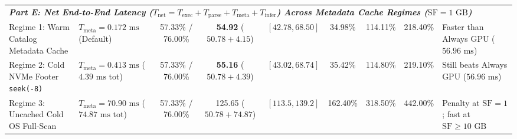 \documentclass[10pt,a4paper]{article}
\newenvironment{fitasttable}{%
  \begin{lrbox}{\asttblbox}%
}{%
  \end{lrbox}%
  \sbox{\asttblboxB}{%
    \ifdim\wd\asttblbox>0.96\textwidth
      \resizebox{0.96\textwidth}{!}{\usebox{\asttblbox}}%
    \else
      \usebox{\asttblbox}%
    \fi
  }%
  \ifdim\ht\asttblboxB>0.78\textheight
    \resizebox{!}{0.78\textheight}{\usebox{\asttblboxB}}%
  \else
    \usebox{\asttblboxB}%
  \fi
}
\begin{document}
\begin{table}[t!]
\begin{fitasttable}
\begin{tabular}{@{}llccccccl@{}}
\hline
\multicolumn{9}{l}{\textit{\textbf{Part E: Net End-to-End Latency ($T_{\text{net}} = T_{\text{exec}} + T_{\text{parse}} + T_{\text{meta}} + T_{\text{infer}}$) Across Metadata Cache Regimes ($\text{SF}=1\text{ GB}$)}}} \\
Regime 1: Warm Catalog Metadata Cache & $T_{\text{meta}}=0.172\text{ ms}$ (Default) & 57.33\% / 76.00\% & \textbf{54.92} ($50.78+4.15$) & $[42.78, 68.50]$ & 34.98\% & 114.11\% & 218.40\% & Faster than Always GPU ($56.96\text{ ms}$) \\
Regime 2: Cold NVMe Footer \texttt{seek(-8)} & $T_{\text{meta}}=0.413\text{ ms}$ ($4.39\text{ ms}$ tot) & 57.33\% / 76.00\% & \textbf{55.16} ($50.78+4.39$) & $[43.02, 68.74]$ & 35.42\% & 114.80\% & 219.10\% & Still beats Always GPU ($56.96\text{ ms}$) \\
Regime 3: Uncached Cold OS Full-Scan & $T_{\text{meta}}=70.90\text{ ms}$ ($74.87\text{ ms}$ tot) & 57.33\% / 76.00\% & 125.65 ($50.78+74.87$) & $[113.5, 139.2]$ & 162.40\% & 318.50\% & 442.00\% & Penalty at $\text{SF}=1$; fast at $\text{SF}\ge 10\text{ GB}$ \\
\hline
\end{tabular}
\end{fitasttable}%
\end{table}
\end{document}
